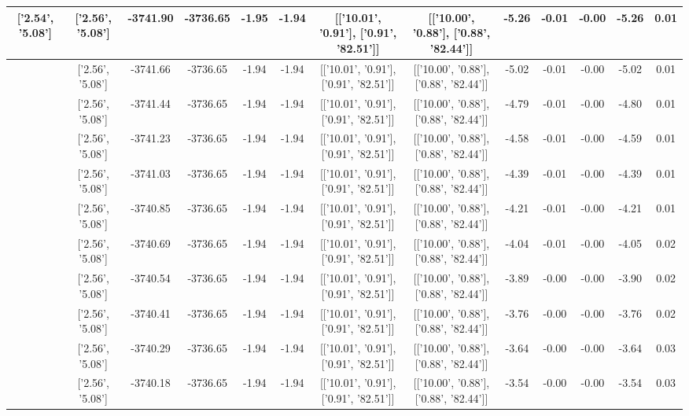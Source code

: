 \begin{table}[htbp]
\begin{adjustbox}{angle=90}
\begin{tabular}{|c|c|c|c|c|c|c|c|c|c|c|c|c|}
 ['2.54', '5.08'] & ['2.56', '5.08'] & -3741.90 & -3736.65 & -1.95 & -1.94 & [['10.01', '0.91'], ['0.91', '82.51']] & [['10.00', '0.88'], ['0.88', '82.44']] & -5.26 & -0.01 & -0.00 & -5.26 & 0.01\\ \hline
 ['2.54', '5.08'] & ['2.56', '5.08'] & -3741.66 & -3736.65 & -1.94 & -1.94 & [['10.01', '0.91'], ['0.91', '82.51']] & [['10.00', '0.88'], ['0.88', '82.44']] & -5.02 & -0.01 & -0.00 & -5.02 & 0.01\\ \hline
 ['2.55', '5.08'] & ['2.56', '5.08'] & -3741.44 & -3736.65 & -1.94 & -1.94 & [['10.01', '0.91'], ['0.91', '82.51']] & [['10.00', '0.88'], ['0.88', '82.44']] & -4.79 & -0.01 & -0.00 & -4.80 & 0.01\\ \hline
 ['2.55', '5.08'] & ['2.56', '5.08'] & -3741.23 & -3736.65 & -1.94 & -1.94 & [['10.01', '0.91'], ['0.91', '82.51']] & [['10.00', '0.88'], ['0.88', '82.44']] & -4.58 & -0.01 & -0.00 & -4.59 & 0.01\\ \hline
 ['2.55', '5.08'] & ['2.56', '5.08'] & -3741.03 & -3736.65 & -1.94 & -1.94 & [['10.01', '0.91'], ['0.91', '82.51']] & [['10.00', '0.88'], ['0.88', '82.44']] & -4.39 & -0.01 & -0.00 & -4.39 & 0.01\\ \hline
 ['2.55', '5.08'] & ['2.56', '5.08'] & -3740.85 & -3736.65 & -1.94 & -1.94 & [['10.01', '0.91'], ['0.91', '82.51']] & [['10.00', '0.88'], ['0.88', '82.44']] & -4.21 & -0.01 & -0.00 & -4.21 & 0.01\\ \hline
 ['2.55', '5.08'] & ['2.56', '5.08'] & -3740.69 & -3736.65 & -1.94 & -1.94 & [['10.01', '0.91'], ['0.91', '82.51']] & [['10.00', '0.88'], ['0.88', '82.44']] & -4.04 & -0.01 & -0.00 & -4.05 & 0.02\\ \hline
 ['2.55', '5.08'] & ['2.56', '5.08'] & -3740.54 & -3736.65 & -1.94 & -1.94 & [['10.01', '0.91'], ['0.91', '82.51']] & [['10.00', '0.88'], ['0.88', '82.44']] & -3.89 & -0.00 & -0.00 & -3.90 & 0.02\\ \hline
 ['2.55', '5.08'] & ['2.56', '5.08'] & -3740.41 & -3736.65 & -1.94 & -1.94 & [['10.01', '0.91'], ['0.91', '82.51']] & [['10.00', '0.88'], ['0.88', '82.44']] & -3.76 & -0.00 & -0.00 & -3.76 & 0.02\\ \hline
 ['2.55', '5.08'] & ['2.56', '5.08'] & -3740.29 & -3736.65 & -1.94 & -1.94 & [['10.01', '0.91'], ['0.91', '82.51']] & [['10.00', '0.88'], ['0.88', '82.44']] & -3.64 & -0.00 & -0.00 & -3.64 & 0.03\\ \hline
 ['2.56', '5.08'] & ['2.56', '5.08'] & -3740.18 & -3736.65 & -1.94 & -1.94 & [['10.01', '0.91'], ['0.91', '82.51']] & [['10.00', '0.88'], ['0.88', '82.44']] & -3.54 & -0.00 & -0.00 & -3.54 & 0.03\\ \hline

\end{tabular}
\end{adjustbox}
\end{table}
